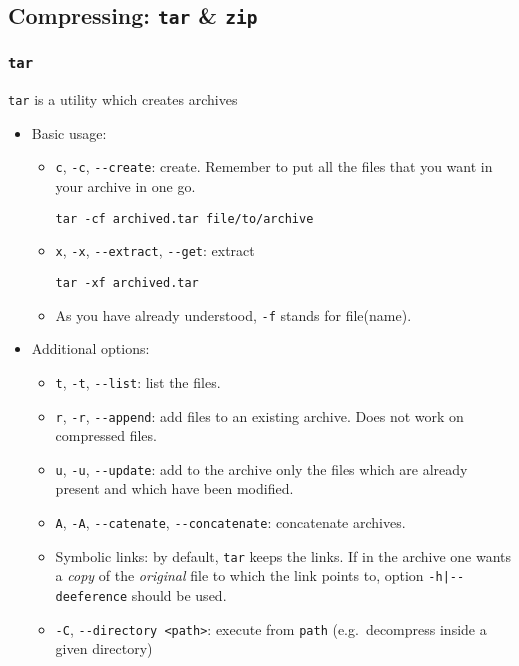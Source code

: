 \documentclass[a4paper,12pt,%
              final%
              ]{article}
\begin{document}
\subsection{Compressing: \texttt{tar} \& \texttt{zip}}
\subsubsection{\texttt{tar}}
\texttt{tar} is a utility which creates archives
\begin{itemize}
  \item Basic usage:
    \begin{itemize}
      \item \verb|c|, \verb|-c|, \verb|--create|: create. Remember to put all the files that you want in your archive in one go.
\begin{verbatim}
tar -cf archived.tar file/to/archive
\end{verbatim}
      \item \verb|x|, \verb|-x|, \verb|--extract|, \verb|--get|: extract
\begin{verbatim}
tar -xf archived.tar
\end{verbatim}
      \item As you have already understood, \verb|-f| stands for file(name).
    \end{itemize}
  \item Additional options:
    \begin{itemize}
      \item \verb|t|, \verb|-t|, \verb|--list|: list the files.
      \item \verb|r|, \verb|-r|, \verb|--append|: add files to an existing archive. Does not work on compressed files.
      \item \verb|u|, \verb|-u|, \verb|--update|: add to the archive only the files which are already present and which have been modified.
      \item \verb|A|, \verb|-A|, \verb|--catenate|, \verb|--concatenate|: concatenate archives.
      \item Symbolic links: by default, \texttt{tar} keeps the links. If in the archive one wants a \emph{copy} of the \emph{original} file to which the link points to, option \verb!-h|--deeference! should be used.
      \item \verb|-C|, \verb|--directory <path>|: execute from \verb|path| (e.g.\ decompress inside a given directory)

\end{itemize}
\end{itemize}
\end{document}
